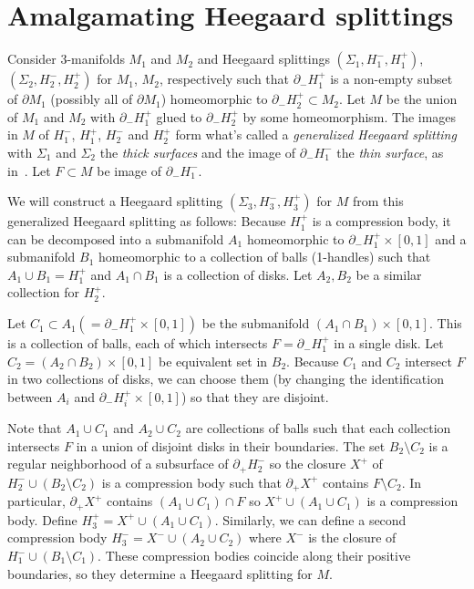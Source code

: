 \documentclass[12pt]{amsart}
\theoremstyle{plain}
\theoremstyle{definition}
\begin{document}
\section{Amalgamating Heegaard splittings}
\label{amalgsect}

Consider 3-manifolds $M_1$ and $M_2$ and Heegaard splittings $(\Sigma_1, H_1^-, H_1^+)$, $(\Sigma_2, H_2^-, H_2^+)$ for $M_1$, $M_2$, respectively such that $\partial_- H_1^+$ is a non-empty subset of $\partial M_1$ (possibly all of $\partial M_1$) homeomorphic to $\partial_- H_2^+ \subset M_2$.  Let $M$ be the union of $M_1$ and $M_2$ with $\partial_- H_1^+$ glued to $\partial_- H_2^+$ by some homeomorphism.  The images in $M$ of $H_1^-$, $H_1^+$, $H_2^-$ and $H_2^+$ form what's called a \textit{generalized Heegaard splitting} with $\Sigma_1$ and $\Sigma_2$ the \textit{thick surfaces} and the image of $\partial_- H^-_1$ the \textit{thin surface}, as in~\cite{sch:thin}.  Let $F \subset M$ be image of $\partial_- H^-_1$.

We will construct a Heegaard splitting $(\Sigma_3, H^-_3, H^+_3)$ for $M$ from this generalized Heegaard splitting as follows:  Because $H^+_1$ is a compression body, it can be decomposed into a submanifold $A_1$ homeomorphic to $\partial_- H^+_1 \times [0,1]$ and a submanifold $B_1$ homeomorphic to a collection of balls (1-handles) such that $A_1 \cup B_1 = H^+_1$ and $A_1 \cap B_1$ is a collection of disks.  Let $A_2, B_2$ be a similar collection for $H^+_2$.  

Let $C_1 \subset A_1 (= \partial_- H_1^+ \times [0,1])$ be the submanifold $(A_1 \cap B_1) \times [0,1]$.  This is a collection of balls, each of which intersects $F = \partial_- H^+_1$ in a single disk.  Let $C_2 = (A_2 \cap B_2) \times [0,1]$ be equivalent set in $B_2$.  Because $C_1$ and $C_2$ intersect $F$ in two collections of disks, we can choose them (by changing the identification between $A_i$ and $\partial_- H_i^+ \times [0,1]$) so that they are disjoint.

Note that $A_1 \cup C_1$ and $A_2 \cup C_2$ are collections of balls such that each collection intersects $F$ in a union of disjoint disks in their boundaries.  The set $B_2 \setminus C_2$ is a regular neighborhood of a subsurface of $\partial_+ H^-_2$ so the closure $X^+$ of $H^-_2 \cup (B_2 \setminus C_2)$ is a compression body such that $\partial_+ X^+$ contains $F \setminus C_2$.  In particular, $\partial_+ X^+$ contains $(A_1 \cup C_1) \cap F$ so $X^+ \cup (A_1 \cup C_1)$ is a compression body.  Define $H_3^+ = X^+ \cup (A_1 \cup C_1)$.  Similarly, we can define a second compression body $H_3^- = X^- \cup (A_2 \cup C_2)$ where $X^-$ is the closure of $H^-_1 \cup (B_1 \setminus C_1)$.  These compression bodies coincide along their positive boundaries, so they determine a Heegaard splitting for $M$.
\end{document}
